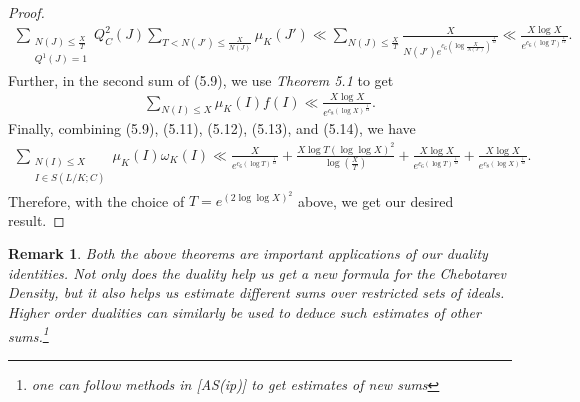 \documentclass[12pt]{article}
\numberwithin{equation}{section}
\newtheorem{remark}[theorem]{Remark}
\numberwithin{equation}{section}
\begin{document}
\begin{proof}
    \begin{align}
        \sum_{\substack{N(J)\leq \frac{X}{T} \\ Q^1(J)=1}}Q_C^2(J)\sum_{T<N(J')\leq \frac{X}{N(J)}}\mu_K(J') \ll \sum_{N(J)\leq \frac{X}{T}} \frac{X}{N(J')e^{c_6\left(\log \frac{X}{N(J')}\right)^{\frac{1}{12}}}} \ll \frac{X\log X}{e^{c_6(\log T)^{\frac{1}{12}}}}.
    \end{align}
    Further, in the second sum of (5.9), we use \textit{Theorem 5.1} to get
    \begin{align}
        \sum_{N(I)\leq X }\mu_K(I)f(I) \ll \frac{X\log X}{e^{c_8(\log X)^{\frac{1}{12}}}} .
    \end{align}
    Finally, combining (5.9), (5.11), (5.12), (5.13), and (5.14), we have
    \begin{align}
         \sum_{\substack{N(I)\leq X \\ I \in S(L/K;C)}}\mu_K(I)\omega_K(I) \ll  \frac{X}{e^{c_6(\log T)^{\frac{1}{12}}}} + \frac{X\log T(\log\log X)^2}{\log \left(\frac{X}{T}\right)} + \frac{X\log X}{e^{c_6(\log T)^{\frac{1}{12}}}} +\frac{X\log X}{e^{c_8(\log X)^{\frac{1}{12}}}} .
    \end{align}
    Therefore, with the choice of $T=e^{(2\log\log X)^2}$ above, we get our desired result.
    \end{proof}
    \begin{remark}
        Both the above theorems are important applications of our duality identities. Not only does the duality help us get a new formula for the Chebotarev Density, but it also helps us estimate different sums over restricted sets of ideals. Higher order dualities can similarly be used to deduce such estimates of other sums.\footnote[13]{one can follow methods in [AS(ip)] to get estimates of new sums} 
    \end{remark}
\end{document}
